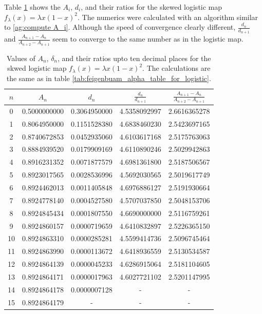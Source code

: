 Table \ref{tab:feigenbuam_constants_skewed_logistic_map} shows the $A_i$, $d_i$, and their ratios for the skewed logistic map $f_{\lambda} (x) = \lambda x (1-x)^2$.
The numerics were calculated with an algorithm similar to \ref{ag:compute A_i}.
Although the speed of convergence clearly different, 
$ \frac{d_n}{d_{n+1}} $ and $\frac{A_{n+1} - A_n}{A_{n+2} - A_{n+1}}$ seem to converge to the same number as in the logistic map.
\begin{table}
\centering
\begin{tabular}{|c|c|c|c|c|}
\hline
\( n \) & \( A_n \) & \( d_n \) &  \(\frac{d_n}{d_{n+1}}\) & \(\frac{A_{n+1} - A_n}{A_{n+2} - A_{n+1}}\)  \\ \hline
0 & 0.5000000000 & 0.3064950000 & 4.5358092997 & 2.6616365278 \\
1 & 0.8064950000 & 0.1151528380 & 4.6838460230 & 2.5423697165 \\
2 & 0.8740672853 & 0.0452935060 & 4.6103617168 & 2.5175763063 \\
3 & 0.8884939520 & 0.0179909169 & 4.6110890246 & 2.5029942863 \\
4 & 0.8916231352 & 0.0071877579 & 4.6981361800 & 2.5187506567 \\
5 & 0.8923017565 & 0.0028536996 & 4.5692030565 & 2.5019617749 \\
6 & 0.8924462013 & 0.0011405848 & 4.6976886127 & 2.5191930664 \\
7 & 0.8924778140 & 0.0004527580 & 4.5707037850 & 2.5048153706 \\
8 & 0.8924845434 & 0.0001807550 & 4.6690000000 & 2.5116759261 \\
9 & 0.8924860157 & 0.0000719659 & 4.6410832897 & 2.5226365150 \\
10 & 0.8924863310 & 0.0000285281 & 4.5599414736 & 2.5096745464 \\
11 & 0.8924863990 & 0.0000113672 & 4.6418936559 & 2.5130534587 \\
12 & 0.8924864139 & 0.0000045233 & 4.6286915064 & 2.5181104605 \\
13 & 0.8924864171 & 0.0000017963 & 4.6027721102 & 2.5201147995 \\
14 & 0.8924864178 & 0.0000007128 &  - &  - \\
15 & 0.8924864179 &  - &  - &  - \\
\hline
\end{tabular}
\caption{
	Values of \( A_n \), \( \delta_n \), and their ratios upto ten decimal places for the skwed logistic map $f_{\lambda}(x) = \lambda x(1-x)^2$.
	The calculations are the same as in table \ref{tab:feigenbuam_alpha_table_for_logistic}.
}
\label{tab:feigenbuam_constants_skewed_logistic_map}
\end{table}
